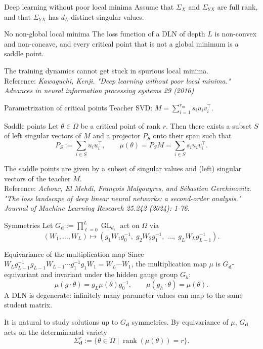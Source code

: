 \documentclass[aspectratio=169,11pt]{beamer}
\begin{document}
\begin{frame}{Deep learning without poor local minima}
Assume that $\Sigma_X$ and $\Sigma_{YX}$ are full rank, and that $\Sigma_{YX}$ has $d_L$ distinct singular values.
\begin{block}{No non-global local minima}
    The loss function of a DLN of depth $L$ is non-convex and non-concave, and every critical point that is not a global minimum is a saddle point.
\end{block}
The training dynamics cannot get stuck in spurious local minima.
\\
Reference: \textit{Kawaguchi, Kenji. "Deep learning without poor local minima." Advances in neural information processing systems 29 (2016)}
\end{frame}
\begin{frame}{Parametrization of critical points}
Teacher SVD: \(M=\sum_{i=1}^{r_m}s_i u_i v_i^{\top}\).
\begin{block}{Saddle points}
    Let $\theta\in\Omega$ be a critical point of rank $r$. Then there exists a subset $S$ of left singular vectors of $M$ and a projector $P_S$ onto their span such that
    \[
    P_S := \sum_{i\in S}u_i u_i^{\top},
    \qquad
    \mu(\theta)=P_S M=\sum_{i\in S}s_i u_i v_i^{\top}.
    \]
\end{block}
The saddle points are given by a subset of singular values and (left) singular vectors of the teacher $M$.
\\
Reference: \textit{Achour, El Mehdi, François Malgouyres, and Sébastien Gerchinovitz. "The loss landscape of deep linear neural networks: a second-order analysis." Journal of Machine Learning Research 25.242 (2024): 1-76.}
\end{frame}
\begin{frame}{Symmetries}
\small
Let $G_{\mathbf{d}}:=\prod_{\ell=0}^{L} \operatorname{GL}_{d_\ell}$ act on $\Omega$ via
\[
(W_1,\ldots,W_L)
\mapsto
(g_1W_1g_0^{-1},\; g_2W_2g_1^{-1},\;\ldots,\; g_L W_L g_{L-1}^{-1}).
\]
\begin{block}{Equivariance of the multiplication map}
    Since \(W_Lg_{L-1}^{-1}g_{L-1}W_{L-1}\cdots g_1^{-1}g_1W_1=W_L\cdots W_1\), the multiplication map $\mu$ is $G_{\mathbf{d}}$-equivariant and invariant under the hidden gauge group $G_h$:
    \[
    \mu(g\cdot \theta)=g_L\mu(\theta)g_0^{-1},
    \qquad
    \mu(g_h\cdot \theta) = \mu(\theta).
    \]
A DLN is degenerate: infinitely many parameter values can map to the same student matrix.
\end{block}
It is natural to study solutions up to $G_{\mathbf{d}}$ symmetries. By equivariance of $\mu$, $G_{\mathbf{d}}$ acts on the determinantal variety
\[
\Sigma_{\mathbf{d}}^{r}:=\{\theta\in \Omega\mid\operatorname{rank}(\mu(\theta)) = r\}.
\]
\end{frame}
\end{document}
